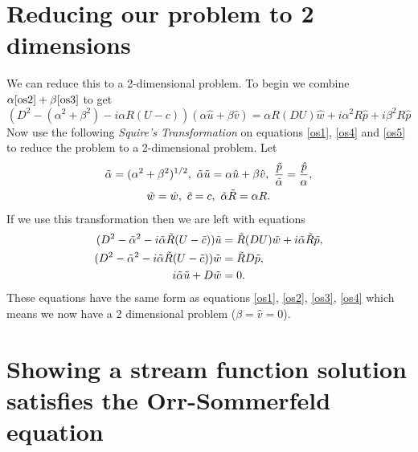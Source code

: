 \section{Reducing our problem to 2 dimensions}
We can reduce this to a 2-dimensional problem. To begin we combine $ \alpha \eqref{os2} + \beta \eqref{os3} $ to get
\begin{equation}
    (D^2 - (\alpha^2+\beta^2) - i \alpha R (U - c)) (\alpha \hat{u} + \beta \hat{v}) = \alpha R (DU) \hat{w} + i \alpha^2 R \hat{p} + i \beta^2 R \hat{p} 
\label{os5}
\end{equation}
Now use the following \emph{Squire's Transformation} \citep{squire1933stability} on equations \eqref{os1}, \eqref{os4} and \eqref{os5} to reduce the problem to a 2-dimensional problem. Let
\begin{gather}
    \Tilde{\alpha} = (\alpha^2 + \beta^2)^{1/2},\ \Tilde{\alpha} \Tilde{u} = \alpha \hat{u} + \beta \hat{v},\ \frac{\Tilde{p}}{\Tilde{\alpha}} = \frac{\hat{p}}{\alpha}, \nonumber\\ \Tilde{w} = \hat{w},\ \Tilde{c} = c,\ \Tilde{\alpha} \Tilde{R} = \alpha R.
\end{gather}
If we use this transformation then we are left with equations
\begin{subequations}
\begin{align}
    (D^2 - \Tilde{\alpha}^2 - i \Tilde{\alpha} \Tilde{R} (U - \Tilde{c}))  \Tilde{u} &= \Tilde{R} (DU) \Tilde{w} + i \Tilde{\alpha} \Tilde{R} \Tilde{p}, \label{os2d1} \\
    (D^2 - \Tilde{\alpha}^2 - i \Tilde{\alpha} \Tilde{R} (U - \Tilde{c})) \Tilde{w} &= \Tilde{R} D \Tilde{p}, \label{os2d2} \\
    i \Tilde{\alpha} \Tilde{u} + D \Tilde{w} &= 0. \label{os2d3}
\end{align}
\end{subequations}
These equations have the same form as equations \eqref{os1}, \eqref{os2}, \eqref{os3}, \eqref{os4} which means we now have a 2 dimensional problem ($ \beta = \hat{v} = 0 $). 

\section{Showing a stream function solution satisfies the Orr-Sommerfeld equation}

